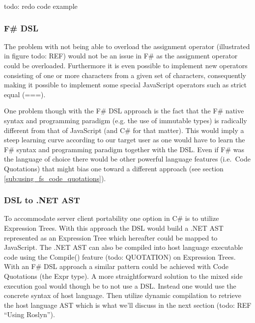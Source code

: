 			todo: redo code example
		

		\subsubsection{F\# DSL} %
		\label{sub:fs_dsl}
			The problem with not being able to overload the assignment operator (illustrated in figure todo: REF) would not be an issue in F\# as the assignment operator could be overloaded. Furthermore it is even possible to implement new operators consisting of one or more characters from a given set of characters, consequently making it possible to implement some special JavaScript operators such as strict equal (===).

			One problem though with the F\# DSL approach is the fact that the F\# native syntax and programming paradigm (e.g. the use of immutable types) is radically different from that of JavaScript (and C\# for that matter). This would imply a steep learning curve according to our target user as one would have to learn the F\# syntax and programming paradigm together with the DSL. Even if F\# was the language of choice there would be other powerful language features (i.e.\ Code Quotations) that might bias one toward a different approach (see section \ref{sub:using_fs_code_quotations}).

		\subsubsection{DSL to .NET AST} %
		\label{sub:dsl_to_net_ast}
			To accommodate server client portability one option in C\# is to utilize Expression Trees. With this approach the DSL would build a .NET AST represented as an Expression Tree which hereafter could be mapped to JavaScript. The .NET AST can also be compiled into host language executable code using the Compile() feature (todo: QUOTATION) on Expression Trees. With an F\# DSL approach a similar pattern could be achieved with Code Quotations (the Expr type). A more straightforward solution to the mixed side execution goal would though be to not use a DSL. Instead one would use the concrete syntax of host language. Then utilize dynamic compilation to retrieve the host language AST which is what we'll discuss in the next section (todo: REF ``Using Roslyn'').


